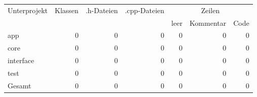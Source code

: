 \begin{tabular}{l|r|r|r|r|r|r}

Unterprojekt & Klassen & .h-Dateien & .cpp-Dateien & \multicolumn{3}{|c}{Zeilen} \\
 & & & & leer & Kommentar & Code \\
\hline
app		& 0	& 0	& 0	& 0	& 0 	& 0	\\
core		& 0	& 0	& 0	& 0	& 0	& 0	\\
interface	& 0	& 0	& 0	& 0	& 0	& 0	\\
test		& 0	& 0	& 0	& 0	& 0	& 0	\\
\hline
Gesamt & 0 & 0 & 0 & 0 & 0 & 0 \\
\end{tabular}
